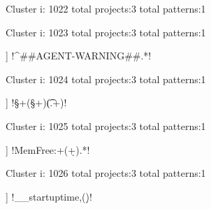 Cluster i: 1022
total projects:3
total patterns:1
\begin{multicols}{1}
\end{multicols}







Cluster i: 1023
total projects:3
total patterns:1
\begin{multicols}{1}
\begin{description}[noitemsep,topsep=0pt]
\item [[3] ] \cverb!^##AGENT-WARNING##.*!
\end{description}
\end{multicols}







Cluster i: 1024
total projects:3
total patterns:1
\begin{multicols}{1}
\begin{description}[noitemsep,topsep=0pt]
\item [[3] ] \cverb!\S+\s(\S+)\t(.+)!
\end{description}
\end{multicols}







Cluster i: 1025
total projects:3
total patterns:1
\begin{multicols}{1}
\begin{description}[noitemsep,topsep=0pt]
\item [[3] ] \cverb!MemFree:\s+(\d+).*!
\end{description}
\end{multicols}







Cluster i: 1026
total projects:3
total patterns:1
\begin{multicols}{1}
\begin{description}[noitemsep,topsep=0pt]
\item [[3] ] \cverb!__startuptime,(\d*)!
\end{description}
\end{multicols}







